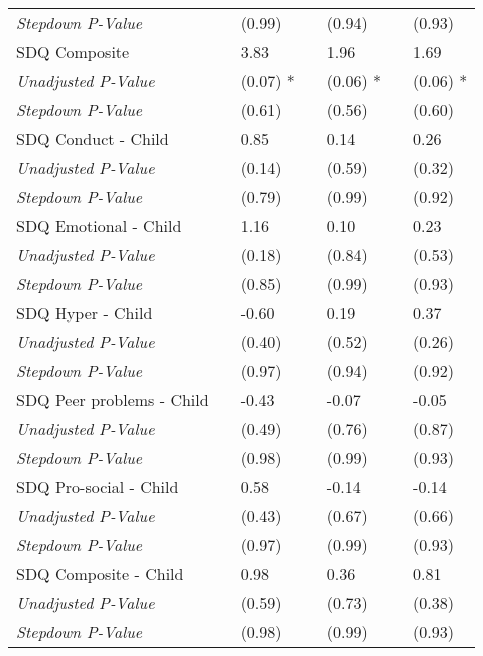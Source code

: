 \begin{tabular}{L{9cm} L{1cm} l L{1cm} l l l}
\quad \textit{Stepdown P-Value} & & (0.99)  & & (0.94)  & & (0.93) \\[3pt]
SDQ Composite & & 3.83 & & 1.96  & & 1.69 \\
\quad \textit{Unadjusted P-Value} & & (0.07) * & & (0.06) * & & (0.06) * \\
\quad \textit{Stepdown P-Value} & & (0.61)  & & (0.56)  & & (0.60) \\[3pt]
SDQ Conduct - Child & & 0.85 & & 0.14  & & 0.26 \\
\quad \textit{Unadjusted P-Value} & & (0.14)  & & (0.59)  & & (0.32) \\
\quad \textit{Stepdown P-Value} & & (0.79)  & & (0.99)  & & (0.92) \\[3pt]
SDQ Emotional - Child & & 1.16 & & 0.10  & & 0.23 \\
\quad \textit{Unadjusted P-Value} & & (0.18)  & & (0.84)  & & (0.53) \\
\quad \textit{Stepdown P-Value} & & (0.85)  & & (0.99)  & & (0.93) \\[3pt]
SDQ Hyper - Child & & -0.60 & & 0.19  & & 0.37 \\
\quad \textit{Unadjusted P-Value} & & (0.40)  & & (0.52)  & & (0.26) \\
\quad \textit{Stepdown P-Value} & & (0.97)  & & (0.94)  & & (0.92) \\[3pt]
SDQ Peer problems - Child & & -0.43 & & -0.07  & & -0.05 \\
\quad \textit{Unadjusted P-Value} & & (0.49)  & & (0.76)  & & (0.87) \\
\quad \textit{Stepdown P-Value} & & (0.98)  & & (0.99)  & & (0.93) \\[3pt]
SDQ Pro-social - Child & & 0.58 & & -0.14  & & -0.14 \\
\quad \textit{Unadjusted P-Value} & & (0.43)  & & (0.67)  & & (0.66) \\
\quad \textit{Stepdown P-Value} & & (0.97)  & & (0.99)  & & (0.93) \\[3pt]
SDQ Composite - Child & & 0.98 & & 0.36  & & 0.81 \\
\quad \textit{Unadjusted P-Value} & & (0.59)  & & (0.73)  & & (0.38) \\
\quad \textit{Stepdown P-Value} & & (0.98)  & & (0.99)  & & (0.93) \\[3pt]
\bottomrule
\end{tabular}
